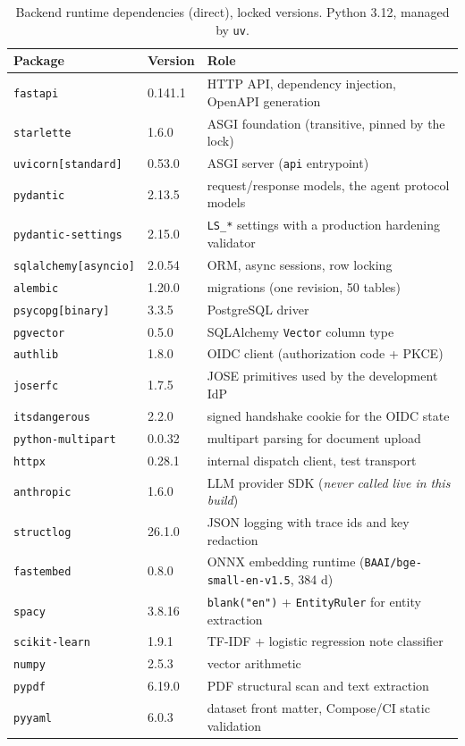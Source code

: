 \documentclass[11pt,a4paper]{article}
\begin{document}
\begin{table}[h]
\centering\small
\caption{Backend runtime dependencies (direct), locked versions. Python 3.12,
managed by \texttt{uv}.}
\begin{tabular}{@{}llL{7.6cm}@{}}
\toprule
\textbf{Package} & \textbf{Version} & \textbf{Role}\\
\midrule
\texttt{fastapi}          & 0.141.1 & HTTP API, dependency injection, OpenAPI generation\\
\texttt{starlette}        & 1.6.0   & ASGI foundation (transitive, pinned by the lock)\\
\texttt{uvicorn[standard]}& 0.53.0  & ASGI server (\texttt{api} entrypoint)\\
\texttt{pydantic}         & 2.13.5  & request/response models, the agent protocol models\\
\texttt{pydantic-settings}& 2.15.0  & \texttt{LS\_*} settings with a production hardening validator\\
\texttt{sqlalchemy[asyncio]} & 2.0.54 & ORM, async sessions, row locking\\
\texttt{alembic}          & 1.20.0  & migrations (one revision, 50 tables)\\
\texttt{psycopg[binary]}  & 3.3.5   & PostgreSQL driver\\
\texttt{pgvector}         & 0.5.0   & SQLAlchemy \texttt{Vector} column type\\
\texttt{authlib}          & 1.8.0   & OIDC client (authorization code + PKCE)\\
\texttt{joserfc}          & 1.7.5   & JOSE primitives used by the development IdP\\
\texttt{itsdangerous}     & 2.2.0   & signed handshake cookie for the OIDC state\\
\texttt{python-multipart} & 0.0.32  & multipart parsing for document upload\\
\texttt{httpx}            & 0.28.1  & internal dispatch client, test transport\\
\texttt{anthropic}        & 1.6.0   & LLM provider SDK (\emph{never called live in this build})\\
\texttt{structlog}        & 26.1.0  & JSON logging with trace ids and key redaction\\
\texttt{fastembed}        & 0.8.0   & ONNX embedding runtime (\texttt{BAAI/bge-small-en-v1.5}, 384 d)\\
\texttt{spacy}            & 3.8.16  & \texttt{blank("en")} + \texttt{EntityRuler} for entity extraction\\
\texttt{scikit-learn}     & 1.9.1   & TF-IDF + logistic regression note classifier\\
\texttt{numpy}            & 2.5.3   & vector arithmetic\\
\texttt{pypdf}            & 6.19.0  & PDF structural scan and text extraction\\
\texttt{pyyaml}           & 6.0.3   & dataset front matter, Compose/CI static validation\\
\bottomrule
\end{tabular}
\end{table}
\end{document}
